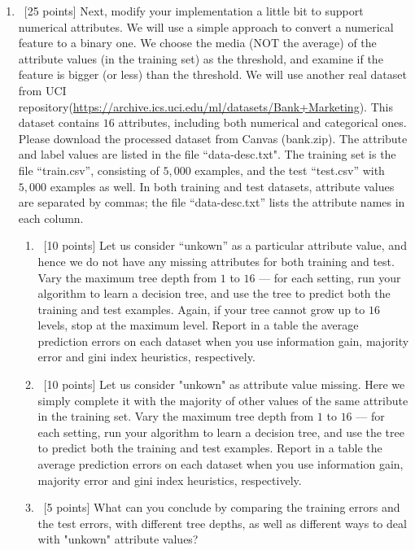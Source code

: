 \documentclass[12pt, fullpage,letterpaper]{article}
\begin{document}
\begin{enumerate}
\item~[25 points] Next, modify your implementation a little bit to support numerical attributes. We will use a simple approach to convert a numerical feature to a binary one. We choose the media (NOT the average) of the attribute values (in the training set) as the threshold, and examine if the feature is bigger (or less) than the threshold. We will use another real dataset from UCI repository(\url{https://archive.ics.uci.edu/ml/datasets/Bank+Marketing}). This dataset contains $16$ attributes, including both numerical and categorical ones. Please download the processed dataset from Canvas (bank.zip).  The attribute and label values are listed in the file ``data-desc.txt". The training set is the file ``train.csv'', consisting of $5,000$ examples, and the test  ``test.csv'' with $5,000$ examples as well.  In both training and test datasets, attribute values are separated by commas; the file ``data-desc.txt''  lists the attribute names in each column. 
\begin{enumerate}
	\item~[10 points] Let us consider ``unkown'' as a particular attribute value, and hence we do not have any missing attributes for both training and test. Vary the maximum  tree depth from $1$ to $16$ --- for each setting, run your algorithm to learn a decision tree, and use the tree to  predict both the training  and test examples. Again, if your tree cannot grow up to $16$ levels, stop at the maximum level. Report in a table the average prediction errors on each dataset when you use information gain, majority error and gini index heuristics, respectively.
	
	\item~[10 points] Let us consider "unkown" as  attribute value missing. Here we simply complete it with the majority of other values of the same attribute in the training set.   Vary the maximum  tree depth from $1$ to $16$ --- for each setting, run your algorithm to learn a decision tree, and use the tree to  predict both the training  and test examples. Report in a table the average prediction errors on each dataset when you use information gain, majority error and gini index heuristics, respectively.
	
	
	\item~[5 points] What can you conclude by comparing the training errors and the test errors, with different tree depths, as well as different ways to deal with "unkown" attribute values?
\end{enumerate}
\end{enumerate}
\end{document}
